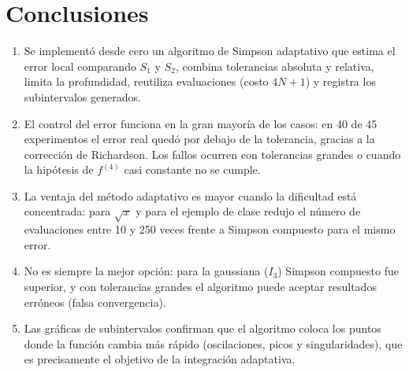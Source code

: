 \documentclass[11pt,letterpaper]{report}
\begin{document}
\section{Conclusiones}
\begin{enumerate}
  \item Se implementó desde cero un algoritmo de Simpson adaptativo que estima el error local
        comparando $S_1$ y $S_2$, combina tolerancias absoluta y relativa, limita la profundidad,
        reutiliza evaluaciones (costo $4N+1$) y registra los subintervalos generados.
  \item El control del error funciona en la gran mayoría de los casos: en 40 de 45 experimentos el
        error real quedó por debajo de la tolerancia, gracias a la corrección de Richardson. Los
        fallos ocurren con tolerancias grandes o cuando la hipótesis de $f^{(4)}$ casi constante no se cumple.
  \item La ventaja del método adaptativo es mayor cuando la dificultad está concentrada:
        para $\sqrt{x}$ y para el ejemplo de clase redujo el número de evaluaciones entre 10 y 250
        veces frente a Simpson compuesto para el mismo error.
  \item No es siempre la mejor opción: para la gaussiana ($I_3$) Simpson compuesto fue superior, y
        con tolerancias grandes el algoritmo puede aceptar resultados erróneos (falsa convergencia).
  \item Las gráficas de subintervalos confirman que el algoritmo coloca los puntos donde la función
        cambia más rápido (oscilaciones, picos y singularidades), que es precisamente el objetivo
        de la integración adaptativa.
\end{enumerate}
\end{document}

